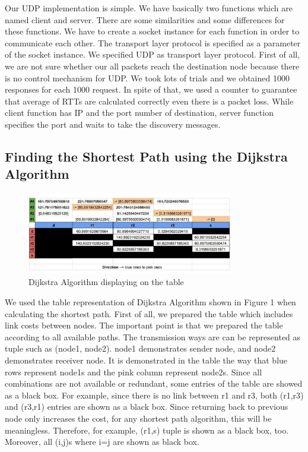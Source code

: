 \documentclass[conference]{IEEEtran}
\begin{document}
Our UDP implementation is simple. We have basically two functions which are named client and server. There are some similarities and some differences for these functions. We have to create a socket instance for each function in order to communicate each other. The transport layer protocol is specified as a parameter of the socket instance. We specified UDP as transport layer protocol. First of all, we are not sure whether our all packets reach the destination node because there is no control mechanism for UDP. We took lots of trials and we obtained 1000 responses for each 1000 request. In spite of that, we used a counter to guarantee that average of RTTs are calculated correctly even there is a packet loss. While client function has IP and the port number of destination, server function specifies the port and waits to take the discovery messages. \\

\subsection{Finding the Shortest Path using the Dijkstra Algorithm}


\begin{figure}[htp]
    \centering
    \includegraphics[width=9cm]{dijkstra.jpeg}
    \caption{Dijkstra Algorithm displaying on the table}
    \label{fig:dijkstra}
\end{figure}

We used the table representation of Dijkstra Algorithm shown in Figure 1 when calculating the shortest path. First of all, we prepared the table which includes link costs between nodes. The important point is that we prepared the table according to all available paths. The transmission ways are can be represented as tuple such as (node1, node2). node1 demonstrates sender node, and node2 demonstrates receiver node. It is demonstrated in the table the way that blue rows represent node1s and the pink column represent node2s. Since all combinations are not available or redundant, some entries of the table are showed as a black box. For example, since there is no link between r1 and r3, both (r1,r3) and (r3,r1) entries are shown as a black box. Since returning back to previous node only increases the cost, for any shortest path algorithm, this will be meaningless. Therefore, for example, (r1,s) tuple is shown as a black box, too. Moreover, all (i,j)s where i=j are shown as black box. \\
\end{document}
